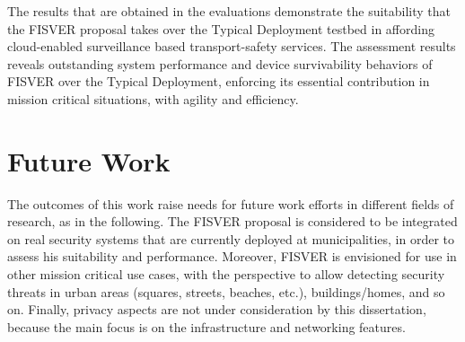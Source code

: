 The results that are obtained in the evaluations demonstrate the suitability that the FISVER proposal takes over  the Typical Deployment testbed in affording cloud-enabled surveillance based transport-safety services. The assessment results reveals outstanding system performance and device survivability behaviors of FISVER over the Typical Deployment, enforcing its essential contribution in mission critical situations, with agility and efficiency. 

\section{Future Work}

The outcomes of this work raise needs for future work efforts in different fields of research, as in the following. The FISVER proposal is considered to be integrated on real security systems that are currently deployed at municipalities, in order to assess his suitability and performance. Moreover, FISVER is envisioned for use in other mission critical use cases, with the perspective to allow detecting security threats in urban areas (squares, streets, beaches, etc.), buildings/homes, and so on. Finally, privacy aspects are not under consideration by this dissertation, because the main focus is on the infrastructure and networking features. 

